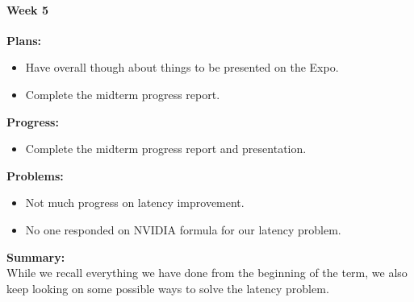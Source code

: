 \paragraph{Week 5}
\begin{adjustwidth}{2.5em}{0pt}
    \vspace{-0.5cm}\textbf{Plans:}
    \vspace{-0.5cm}
    \begin{itemize}
        \item Have overall though about things to be presented on the Expo.
        \item Complete the midterm progress report.
    \end{itemize} 
    \vspace{-0.3cm}\textbf{Progress:}
    \vspace{-0.5cm}
    \begin{itemize}
        \item Complete the midterm progress report and presentation.
    \end{itemize} 
    \vspace{-0.3cm}\textbf{Problems:}
    \vspace{-0.5cm}
    \begin{itemize}
        \item Not much progress on latency improvement.
        \item No one responded on NVIDIA formula for our latency problem.
    \end{itemize}  
    \vspace{-0.3cm}\noindent\textbf{Summary:}\\
    \noindent While we recall everything we have done from the beginning of the term, we also keep looking 
    on some possible ways to solve the latency problem. \\
\end{adjustwidth} 

